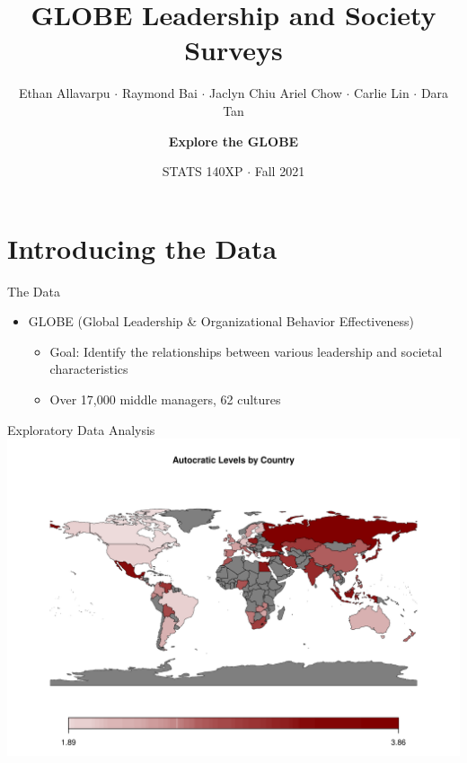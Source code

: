 \documentclass[
  ignorenonframetext,
]{beamer}
\title{GLOBE Leadership and Society Surveys}
\subtitle{Ethan Allavarpu \(\cdot\) Raymond Bai \(\cdot\) Jaclyn Chiu
\newline Ariel Chow \(\cdot\) Carlie Lin \(\cdot\) Dara Tan}
\author{\textbf{Explore the GLOBE}}
\date{STATS 140XP \(\cdot\) Fall 2021}
\providecommand{\tightlist}{%
  \setlength{\itemsep}{0pt}\setlength{\parskip}{0pt}}
\begin{document}
\frame{\titlepage}

\hypertarget{introducing-the-data}{%
\section{Introducing the Data}\label{introducing-the-data}}

\begin{frame}{The Data}
\protect\hypertarget{the-data}{}
\begin{itemize}
\tightlist
\item
  GLOBE (Global Leadership \& Organizational Behavior Effectiveness)

  \begin{itemize}
  \tightlist
  \item
    Goal: Identify the relationships between various leadership and
    societal characteristics
  \item
    Over 17,000 middle managers, 62 cultures
  \end{itemize}
\end{itemize}
\end{frame}

\begin{frame}{Exploratory Data Analysis}
\protect\hypertarget{exploratory-data-analysis}{}
\includegraphics{final_slides_files/figure-beamer/eda_leader-1.pdf}
\end{frame}
\end{document}
